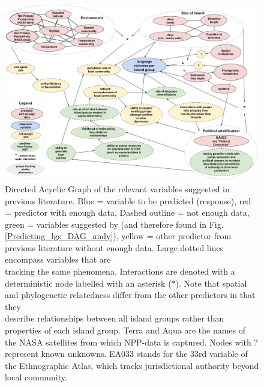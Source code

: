 \documentclass[unnumsec,webpdf,modern,medium]{oup-authoring-template}
\begin{document}
\begin{figure} 
\includegraphics[width=\textwidth]{Predicting_lgs_DAG_full}
\caption{Directed Acyclic Graph of the relevant variables suggested in previous literature. Blue = variable to be predicted (response), red = predictor with enough data, Dashed outline = not enough data,\\ green = variables suggested by \citet{pawley2007} (and therefore found in Fig. \ref{Predicting_lgs_DAG_andy}), yellow = other predictor from previous literature without enough data. Large dotted lines encompass variables that are \\tracking the same phenomena.  Interactions are denoted with a deterministic node labelled with an asterisk ($\ast$). Note that spatial and phylogenetic relatedness differ from the other predictors in that they\\ describe relationships between all island groups rather than properties of each island group. Terra and Aqua are the names of the NASA satellites from which NPP-data is captured. Nodes with ? \\represent known unknowns. EA033 stands for the 33rd variable of the Ethnographic Atlas, which tracks jurisdictional authority beyond local community.}
\label{Predicting_lgs_DAG_full}
\end{figure}

\FloatBarrier

\FloatBarrier
\end{document}

